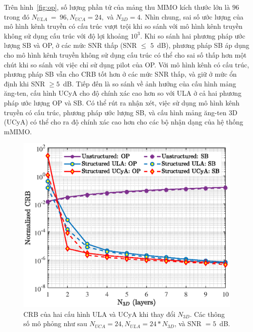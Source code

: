 Trên hình~\ref{fig:op}, số lượng phần tử của mảng thu MIMO kích thước lớn là $96$ trong đó $N_{ULA}~=~96, N_{UCA} = 24,$ và $N_{3D} = 4$. Nhìn chung, sai số ước lượng của mô hình kênh truyền có cấu trúc vượt trội khi so sánh với mô hình kênh truyền không sử dụng cấu trúc với độ lợi khoảng $10^3$. Khi so sánh hai phương pháp ước lượng SB và OP, ở các mức SNR thấp (SNR $\le$ $5$~dB), phương pháp SB áp dụng cho mô hình kênh truyền không sử dụng cấu trúc có thể cho sai số thấp hơn một chút khi so sánh với việc chỉ sử dụng pilot của OP. Với mô hình kênh có cấu trúc, phương pháp SB vẫn cho CRB tốt hơn ở các mức SNR thấp, và giữ ở mức ổn định khi SNR $\ge 5$~dB. Tiếp đến là so sánh về ảnh hưởng của cấu hình mảng ăng-ten, cấu hình UCyA cho độ chính xác cao hơn so với ULA ở cả hai phương pháp ước lượng OP và SB. Có thể rút ra nhận xét, việc sử dụng mô hình kênh truyền có cấu trúc, phương pháp ước lượng SB, và cấu hình mảng ăng-ten 3D (UCyA) có thể cho ra độ chính xác cao hơn cho các bộ nhận dạng của hệ thống mMIMO.
\begin{figure}[ht]
    \centering
    \includegraphics[width=\linewidth]{figures/fig_2_3.eps}
    \caption{CRB của hai cấu hình ULA và UCyA khi thay đổi $N_{3D}$. Các thông số mô phỏng như sau $N_{UCA} = 24, N_{ULA} = 24 * N_{3D}$, và SNR $=5$~dB.}
    \label{fig:op_N3D}
\end{figure}

